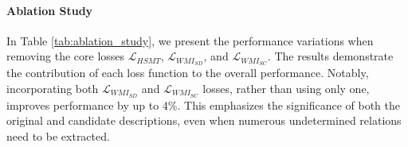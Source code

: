 \paragraph{Ablation Study}
In Table \ref{tab:ablation_study}, we present the performance variations when removing the core losses $\mathcal{L}_{HSMT}$, $\mathcal{L}_{WMI_{SD}}$, and $\mathcal{L}_{WMI_{SC}}$. The results demonstrate the contribution of each loss function to the overall performance. Notably, incorporating both $\mathcal{L}_{WMI_{SD}}$ and $\mathcal{L}_{WMI_{SC}}$ losses, rather than using only one, improves performance by up to 4\%. This emphasizes the significance of both the original and candidate descriptions, even when numerous undetermined relations need to be extracted.

